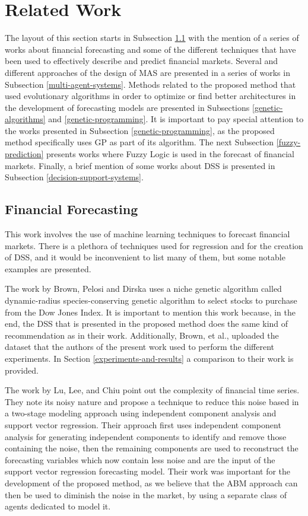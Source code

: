 \documentclass[a4paper,twoside]{article}
\begin{document}
\section{Related Work}
\label{related-work}

The layout of this section starts in Subsection \ref{financial-forecasting} with the mention of a series of works about financial forecasting and some of the different techniques that have been used to effectively describe and predict financial markets. Several and different approaches of the design of MAS are presented in a series of works in Subsection \ref{multi-agent-systems}. Methods related to the proposed method that used evolutionary algorithms in order to optimize or find better architectures in the development of forecasting models are presented in Subsections \ref{genetic-algorithms} and \ref{genetic-programming}. It is important to pay special attention to the works presented in Subsection \ref{genetic-programming}, as the proposed method specifically uses GP as part of its algorithm. The next Subsection \ref{fuzzy-prediction} presents works where Fuzzy Logic is used in the forecast of financial markets. Finally, a brief mention of some works about DSS is presented in Subsection \ref{decision-support-systems}.

\subsection{Financial Forecasting}
\label{financial-forecasting}

This work involves the use of machine learning techniques to forecast financial markets. There is a plethora of techniques used for regression and for the creation of DSS, and it would be inconvenient to list many of them, but some notable examples are presented.

The work by Brown, Pelosi and Dirska \cite{brown2013dynamic} uses a niche genetic algorithm called dynamic-radius species-conserving genetic algorithm to select stocks to purchase from the Dow Jones Index. It is important to mention this work because, in the end, the DSS that is presented in the proposed method does the same kind of recommendation as in their work. Additionally, Brown, et al., uploaded the dataset that the authors of the present work used to perform the different experiments. In Section \ref{experiments-and-results} a comparison to their work is provided.

The work by Lu, Lee, and Chiu \cite{Lu2009} point out the complexity of financial time series. They note its noisy nature and propose a technique to reduce this noise based in a two-stage modeling approach using independent component analysis and support vector regression. Their approach first uses independent component analysis for generating independent components to identify and remove those containing the noise, then the remaining components are used to reconstruct the forecasting variables which now contain less noise and are the input of the support vector regression forecasting model. Their work was important for the development of the proposed method, as we believe that the ABM approach can then be used to diminish the noise in the market, by using a separate class of agents dedicated to model it.
\end{document}
